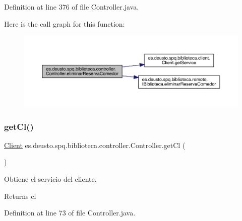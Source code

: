 Definition at line 376 of file Controller.\+java.

Here is the call graph for this function\+:
\nopagebreak
\begin{figure}[H]
\begin{center}
\leavevmode
\includegraphics[width=350pt]{classes_1_1deusto_1_1spq_1_1biblioteca_1_1controller_1_1_controller_a709f6d0a11f0207932b47d670151c10e_cgraph}
\end{center}
\end{figure}
\mbox{\label{classes_1_1deusto_1_1spq_1_1biblioteca_1_1controller_1_1_controller_a14860df4246cd7cefcc7e9e460d504ce}} 
\subsubsection{\texorpdfstring{get\+Cl()}{getCl()}}
{\footnotesize\ttfamily \mbox{\hyperlink{classes_1_1deusto_1_1spq_1_1biblioteca_1_1client_1_1_client}{Client}} es.\+deusto.\+spq.\+biblioteca.\+controller.\+Controller.\+get\+Cl (\begin{DoxyParamCaption}{ }\end{DoxyParamCaption})}

Obtiene el servicio del cliente. \begin{DoxyReturn}{Returns}
cl 
\end{DoxyReturn}


Definition at line 73 of file Controller.\+java.

